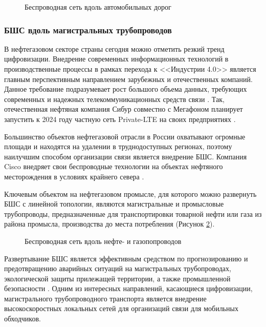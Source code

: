 \begin{figure}[ht]
  \caption{Беспроводная сеть вдоль автомобильных дорог}\label{fig:part2_roadisdeunit}
\end{figure}

\subsubsection{БШС вдоль магистральных трубопроводов}

В нефтегазовом секторе страны сегодня можно отметить резкий тренд цифровизации.  Внедрение современных информационных технологий в производственные процессы в рамках перехода к <<Индустрии 4.0>> является главным перспективным направлением зарубежных и отечественных компаний. Данное требование подразумевает рост большого объема данных, требующих современных и надежных телекоммуникационных средств связи \cite{sibur, cambiumnetworks_wireless, cisco_oil_gas, cisco_oil_gas, gegridsolutions_wireless, cisco_oil_gas}. Так, отечественная нефтяная компания Сибур совместно с Мегафоном планирует запустить к 2024 году частную сеть Private-LTE на своих предприятиях \cite{sibur}. 

Большинство объектов нефтегазовой отрасли в России охватывают огромные площади и находятся на удалении в труднодоступных регионах, поэтому наилучшим способом организации связи является внедрение БШС. Компания Cisco внедряет свои беспроводные технологии на объектах нефтяного месторождения в условиях крайнего севера \cite{cisco_oil_gas}.


Ключевым объектом на нефтегазовом промысле, для которого можно развернуть БШС с линейной топологии, являются магистральные и промысловые трубопроводы, предназначенные для транспортировки товарной нефти или газа из района промысла, производства до места потребления \cite{Deineko2018} (Рисунок \ref{fig:part2_pipeline}). 

\begin{figure}[ht]
  \caption{Беспроводная сеть вдоль нефте- и газопопроводов}\label{fig:part2_pipeline}
\end{figure}

Развертывание БШС является эффективным средством по прогнозированию и предотвращению аварийных ситуаций на магистральных трубопроводах, экологической защиты прилежащей территории, а также промышленной безопасности \cite{Krzyszton2021,Mehmood2016, Lin2019, Adegboye2019, Lin2019}. Одним из интересных направлений, касающиеся цифровизации, магистрального трубопроводного транспорта является внедрение высокоскоростных локальных сетей для организаций связи для мобильных обходчиков. 

